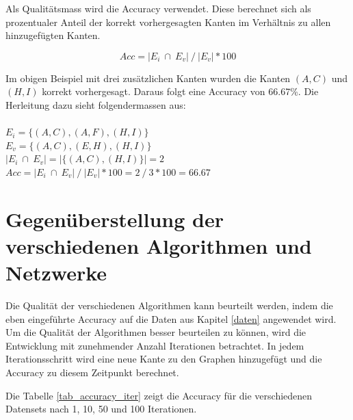 Als Qualitätsmass wird die Accuracy verwendet.
Diese berechnet sich als prozentualer Anteil der korrekt vorhergesagten Kanten im Verhältnis zu allen hinzugefügten Kanten.

\begin{equation}
    \label{eq:acc}
    Acc = | E_i \ \cap \ E_v| \ / \ |E_v| * 100
\end{equation}

Im obigen Beispiel mit drei zusätzlichen Kanten wurden die Kanten $(A,C)$ und $(H,I)$ korrekt vorhergesagt.
Daraus folgt eine Accuracy von 66.67\%.
Die Herleitung dazu sieht folgendermassen aus:\\
\\
\vspace{4mm}
\forceindent $E_i = \{(A,C), (A,F), (H,I)\}$\\
\vspace{4mm}
\forceindent $E_v = \{(A,C), (E,H), (H,I)\}$\\
\vspace{4mm}
\forceindent $| E_i \ \cap \ E_v| = |\{(A,C), (H,I)\}| = 2$\\
\vspace{4mm}
\forceindent $Acc = | E_i \ \cap \ E_v| \ / \ |E_v| * 100 = 2 \ / \ 3 * 100 = 66.67$\\

\section{Gegenüberstellung der verschiedenen Algorithmen und Netzwerke}
Die Qualität der verschiedenen Algorithmen kann beurteilt werden, indem die eben eingeführte Accuracy auf die Daten aus Kapitel \ref{daten} angewendet wird.
Um die Qualität der Algorithmen besser beurteilen zu können, wird die Entwicklung mit zunehmender Anzahl Iterationen betrachtet.
In jedem Iterationsschritt wird eine neue Kante zu den Graphen hinzugefügt und die Accuracy zu diesem Zeitpunkt berechnet.

Die Tabelle \ref{tab_accuracy_iter} zeigt die Accuracy für die verschiedenen Datensets nach 1, 10, 50 und 100 Iterationen.

\begin{table}[]
    \centering
    \caption{Metrikwerte der Netzwerke}
    \label{tab_accuracy_iter}
\end{table}
